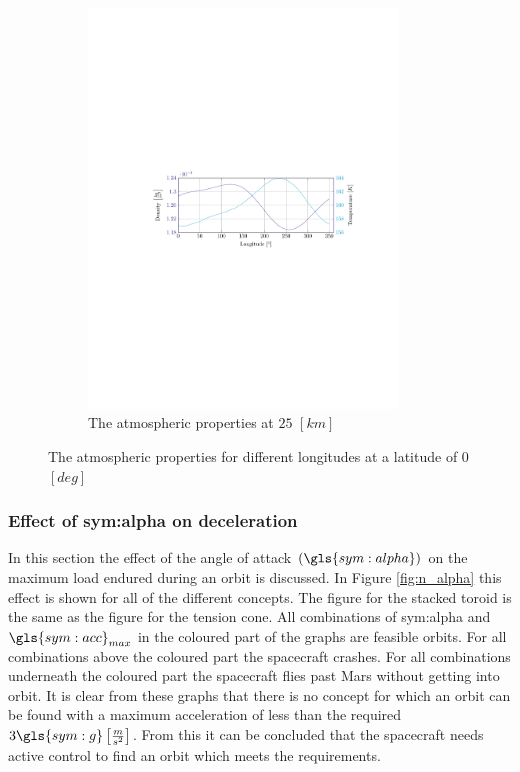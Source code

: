 \begin{figure}[ht!]
\begin{subfigure}{0.9\textwidth}
	\includegraphics[trim={4.5cm 11cm 3.1cm 11cm},clip,width=0.9\textwidth]{Figure/atmos_model/lon_25.pdf}
	\caption{The atmospheric properties at $25$ $\left[km\right]$} 
	\label{fig:atmos_lon_25}
	\end{subfigure}
	\caption{The atmospheric properties for different longitudes at a latitude of 0 $\left[deg\right]$}
	\label{fig:atmos_lon}
\end{figure}

\subsubsection{Effect of \gls{sym:alpha} on deceleration}
\label{sec:astrodec}

In this section the effect of the angle of attack $\left(\gls{sym:alpha}\right)$ on the maximum load endured during an orbit is discussed. In Figure \ref{fig:n_alpha} this effect is shown for all of the different concepts. The figure for the stacked toroid is the same as the figure for the tension cone. All combinations of \gls{sym:alpha} and $\gls{sym:acc}_{max}$ in the coloured part of the graphs are feasible orbits. For all combinations above the coloured part the spacecraft crashes. For all combinations underneath the coloured part the spacecraft flies past Mars without getting into orbit. It is clear from these graphs that there is no concept for which an orbit can be found with a maximum acceleration of less than the required $3 \gls{sym:g} \left[\frac{m}{s^2}\right]$. From this it can be concluded that the spacecraft needs active control to find an orbit which meets the requirements.

